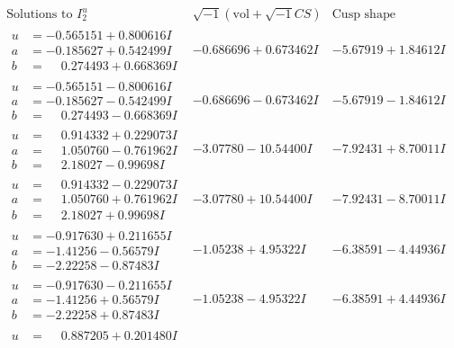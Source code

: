 \documentclass[1p]{elsarticle_modified}
\theoremstyle{definition}
\newcommand{\I}{\sqrt{-1}}
\begin{document}
$$\begin{array}{c|c|c}  
\text{Solutions to }I^u_{2}& \I (\text{vol} + \sqrt{-1}CS) & \text{Cusp shape}\\
 \hline 
\begin{aligned}
u &= -0.565151 + 0.800616 I \\
a &= -0.185627 + 0.542499 I \\
b &= \phantom{-}0.274493 + 0.668369 I\end{aligned}
 & -0.686696 + 0.673462 I & -5.67919 + 1.84612 I \\ \hline\begin{aligned}
u &= -0.565151 - 0.800616 I \\
a &= -0.185627 - 0.542499 I \\
b &= \phantom{-}0.274493 - 0.668369 I\end{aligned}
 & -0.686696 - 0.673462 I & -5.67919 - 1.84612 I \\ \hline\begin{aligned}
u &= \phantom{-}0.914332 + 0.229073 I \\
a &= \phantom{-}1.050760 - 0.761962 I \\
b &= \phantom{-}2.18027 - 0.99698 I\end{aligned}
 & -3.07780 - 10.54400 I & -7.92431 + 8.70011 I \\ \hline\begin{aligned}
u &= \phantom{-}0.914332 - 0.229073 I \\
a &= \phantom{-}1.050760 + 0.761962 I \\
b &= \phantom{-}2.18027 + 0.99698 I\end{aligned}
 & -3.07780 + 10.54400 I & -7.92431 - 8.70011 I \\ \hline\begin{aligned}
u &= -0.917630 + 0.211655 I \\
a &= -1.41256 - 0.56579 I \\
b &= -2.22258 - 0.87483 I\end{aligned}
 & -1.05238 + 4.95322 I & -6.38591 - 4.44936 I \\ \hline\begin{aligned}
u &= -0.917630 - 0.211655 I \\
a &= -1.41256 + 0.56579 I \\
b &= -2.22258 + 0.87483 I\end{aligned}
 & -1.05238 - 4.95322 I & -6.38591 + 4.44936 I \\ \hline\begin{aligned}
u &= \phantom{-}0.887205 + 0.201480 I \\

\end{aligned}
\end{array}$$
\end{document}
